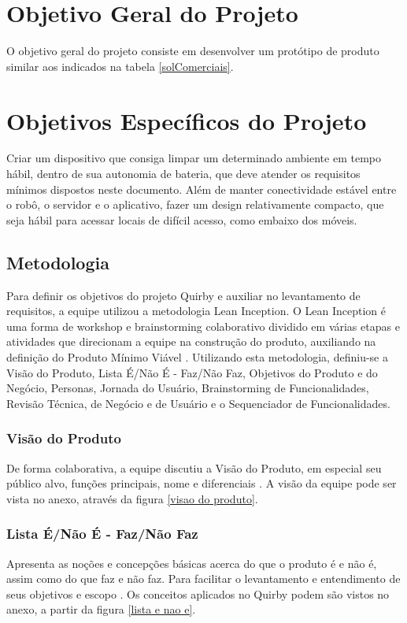 \section{Objetivo Geral do Projeto}
O objetivo geral do projeto consiste em desenvolver um protótipo de produto similar aos indicados na tabela \ref{solComerciais}.

\section{Objetivos Específicos do Projeto}

 Criar um dispositivo que consiga limpar um determinado ambiente em tempo hábil, dentro de sua autonomia de bateria, que deve atender os requisitos mínimos dispostos neste documento. Além de manter conectividade estável entre o robô, o servidor e o aplicativo, fazer um design relativamente compacto, que seja hábil para acessar locais de difícil acesso, como embaixo dos móveis.

\subsection{Metodologia}
	Para definir os objetivos do projeto Quirby e auxiliar no levantamento de requisitos, a equipe utilizou a metodologia Lean Inception. O Lean Inception é uma forma de workshop e brainstorming colaborativo dividido em várias etapas e atividades que direcionam a equipe na construção do produto, auxiliando na definição do Produto Mínimo Viável \cite{caroli}.
	Utilizando esta metodologia, definiu-se a Visão do Produto, Lista É/Não É - Faz/Não Faz, Objetivos do Produto e do Negócio, Personas, Jornada do Usuário, Brainstorming de Funcionalidades, Revisão Técnica, de Negócio e de Usuário e o Sequenciador de Funcionalidades.
 \subsubsection{Visão do Produto}
 De forma colaborativa, a equipe discutiu a Visão do Produto, em especial seu público alvo, funções principais, nome e diferenciais \cite{caroli}. A visão da equipe pode ser vista no anexo, através da figura \ref{visao do produto}.

 \subsubsection{Lista É/Não É - Faz/Não Faz}
 Apresenta as noções e concepções básicas acerca do que o produto é e não é, assim como do que faz e não faz. Para facilitar o levantamento e entendimento de seus objetivos e escopo \cite{caroli}. Os conceitos aplicados no Quirby podem são vistos no anexo, a partir da figura \ref{lista e nao e}.

